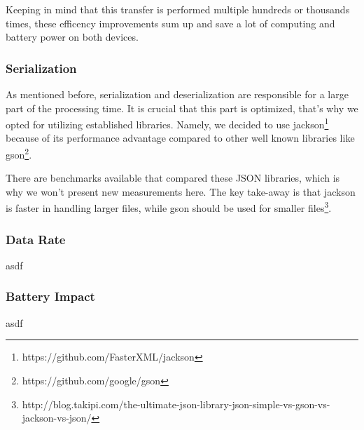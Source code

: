 Keeping in mind that this transfer is performed multiple hundreds or thousands times, these efficency improvements sum up and save a lot of computing and battery power on both devices.

\subsubsection{Serialization}
As mentioned before, serialization and deserialization are responsible for a large part of the processing time.
It is crucial that this part is optimized, that's why we opted for utilizing established libraries.
Namely, we decided to use jackson\footnote{https://github.com/FasterXML/jackson} because of its performance advantage compared to other well known libraries like gson\footnote{https://github.com/google/gson}.

There are benchmarks available that compared these JSON libraries, which is why we won't present new measurements here.
The key take-away is that jackson is faster in handling larger files, while gson should be used for smaller files\footnote{http://blog.takipi.com/the-ultimate-json-library-json-simple-vs-gson-vs-jackson-vs-json/}.

\subsubsection{Data Rate}
asdf

\subsubsection{Battery Impact}
asdf


\clearpage